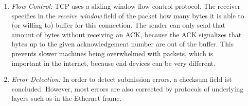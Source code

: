 \begin{enumerate}
\begin{enumerate}
                  \item \textit{Flow Control:} \ac{TCP} uses a sliding window flow control protocol. The receiver specifies in the \textit{receive window} field of the packet how many bytes it is able to (or willing to) buffer for this connection. The sender can only send that amount of bytes without receiving an ACK, because the ACK signalizes that bytes up to the given acknowledgement number are out of the buffer. This prevents slower machines being overwhelmed with packets, which is important in the internet, because end devices can be very different.
                  \item \textit{Error Detection:} In order to detect submission errors, a checksum field ist concluded. However, most errors are also corrected by protocols of underlying layers such as in the Ethernet frame.
            \end{enumerate}


\end{enumerate}
